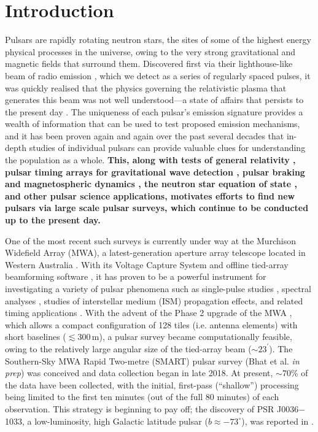 \documentclass[linenumbers]{aastex631}
\newcommand{\psrnick}{J0036$-$1033}
\begin{document}
\section{Introduction} \label{sec:intro}

Pulsars are rapidly rotating neutron stars, the sites of some of the highest energy physical processes in the universe, owing to the very strong gravitational and magnetic fields that surround them.
Discovered first via their lighthouse-like beam of radio emission \citep{Hewish1968}, which we detect as a series of regularly spaced pulses, it was quickly realised that the physics governing the relativistic plasma that generates this beam was not well understood---a state of affairs that persists to the present day \citep[e.g.][]{Melrose2021}.
The uniqueness of each pulsar's emission signature provides a wealth of information that can be used to test proposed emission mechanisms, and it has been proven again and again over the past several decades that in-depth studies of individual pulsars can provide valuable clues for understanding the population as a whole.
{\bf
This, along with tests of general relativity \citep[e.g.][]{Kramer2006,Miao2021}, pulsar timing arrays for gravitational wave detection \citep[e.g.][]{Manchester2013}, pulsar braking and magnetospheric dynamics \citep[e.g.][]{Gao2017,Wang2020}, the neutron star equation of state \citep[e.g.][]{Demorest2010,Antoniadis2013,Pang2021}, and other pulsar science applications, motivates efforts to find new pulsars via large scale pulsar surveys, which continue to be conducted up to the present day.
}

One of the most recent such surveys is currently under way at the Murchison Widefield Array (MWA), a latest-generation aperture array telescope located in Western Australia \citep{Tingay2013}.
With its Voltage Capture System \citep[VCS;][]{Tremblay2015} and offline tied-array beamforming software \citep{Ord2019,McSweeney2020}, it has proven to be a powerful instrument for investigating a variety of pulsar phenomena such as single-pulse studies \citep{McSweeney2017}, spectral analyses \citep{Meyers2017}, studies of interstellar medium (ISM) propagation effects, and related timing applications \citep{Bhat2018,Kaur2019}.
With the advent of the Phase 2 upgrade of the MWA \citep{Wayth2018}, which allows a compact configuration of 128 tiles (i.e. antenna elements) with short baselines ($\lesssim300\,$m), a pulsar survey became computationally feasible, owing to the relatively large angular size of the tied-array beam ($\sim23^\prime$).
The Southern-Sky MWA Rapid Two-metre (SMART) pulsar survey (Bhat et al. \textit{in prep}) was conceived and data collection began in late 2018.
At present, $\sim70\%$ of the data have been collected, with the initial, first-pass (``shallow'') processing being limited to the first ten minutes (out of the full 80 minutes) of each observation.
This strategy is beginning to pay off; the discovery of PSR \psrnick{}, a low-luminosity, high Galactic latitude pulsar ($b \approx -73^{\circ}$), was reported in \citet{Swainston2021}.
\end{document}
